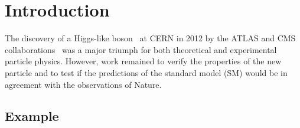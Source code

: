 \chapter{Introduction}\label{chapter:introduction}

The discovery of a Higgs-like boson~\cite{Higgs:1964ia,Higgs:1964pj,Higgs:1966ev,Englert:1964et,Guralnik:1964eu} at CERN in 2012 by the ATLAS and CMS collaborations~\cite{Aad:2012tfa,Chatrchyan:2012xdj} was a major triumph for both theoretical and experimental particle physics.
However, work remained to verify the properties of the new particle and to test if the predictions of the standard model (SM) would be in agreement with the observations of Nature.

\section{Example}\label{sec:example}

